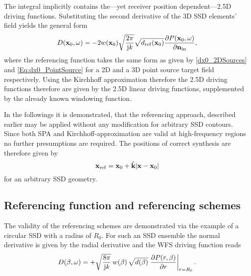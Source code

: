 The integral implicitly contains the---yet receiver position dependent---2.5D driving functions. Substituting the second derivative of the 3D SSD elements' field yields the general form 
\begin{equation}
D(\mathbf{x}_0,\omega) = -2 w(\mathbf{x}_0) \sqrt{\frac{2 \pi}{\mathrm{j} k}}\sqrt{d_{\mathrm{ref}}(\mathbf{x}_0)}
\frac{\partial P(\mathbf{x}_0,\omega)}{\partial \mathbf{n}_{\mathrm{in}}},
\end{equation}
where the referencing function takes the same form as given by \eqref{dx0_2DSources} and \eqref{Eq:dx0_PointSource} for a 2D and a 3D point source target field respectively. Using the Kirchhoff approximation therefore the 2.5D driving functions therefore are given by the 2.5D linear driving functions, supplemented by the already known windowing function.

In the followings it is demonstrated, that the referencing approach, described earlier may be applied without any modification for arbitrary SSD contours. 
Since both SPA and Kirchhoff-approximation are valid at high-frequency regions no further presumptions are required. The positions of correct synthesis are therefore given by
\begin{equation}
\mathbf{x}_{\mathrm{ref}} = \mathbf{x}_0 + \hat{\mathbf{k}} |\mathbf{x}-\mathbf{x}_0|
\end{equation}
for an arbitrary SSD geometry.


\subsection{Referencing function and referencing schemes}

The validity of the referencing schemes are demonstrated via the example of a circular SSD with a radius of $R_0$. 
For such an SSD ensemble the normal derivative is given by the radial derivative and the WFS driving function reads
\begin{equation}
D(\beta,\omega) = + \sqrt{\frac{8\pi}{\mathrm{j} k}}\,w(\beta)\,\sqrt{d(\beta)} \left. \frac{\partial P(r,\beta)}{\partial r}  \right|_{r = R_0}.
\end{equation}

